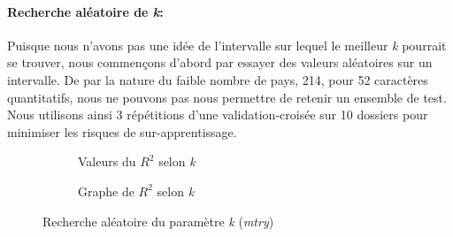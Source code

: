 	\paragraph{Recherche aléatoire de \textit{k}:} Puisque nous n'avons pas une idée de l'intervalle sur lequel le meilleur \textit{k} pourrait se trouver, nous commençons d'abord par essayer des valeurs aléatoires sur un intervalle. De par la nature du faible nombre de pays, 214, pour 52 caractères quantitatifs, nous ne pouvons pas nous permettre de retenir un ensemble de test. Nous utilisons ainsi 3 répétitions d'une validation-croisée sur 10 dossiers pour minimiser les risques de sur-apprentissage.
	\begin{figure}[H]
				\begin{subfigure}{.5\textwidth}
					\centering
					\caption{Valeurs du $R^2$ selon \textit{k} }
					\label{fig:mtry1}
				\end{subfigure}
				\begin{subfigure}{.5\textwidth}
						\centering
						\caption{Graphe de $R^2$ selon \textit{k}}
						\label{fig:mtry2}
				\end{subfigure}
				\caption{Recherche aléatoire du paramètre \textit{k} (\textit{mtry})}
				\label{fig:mtry}
					\end{figure}
